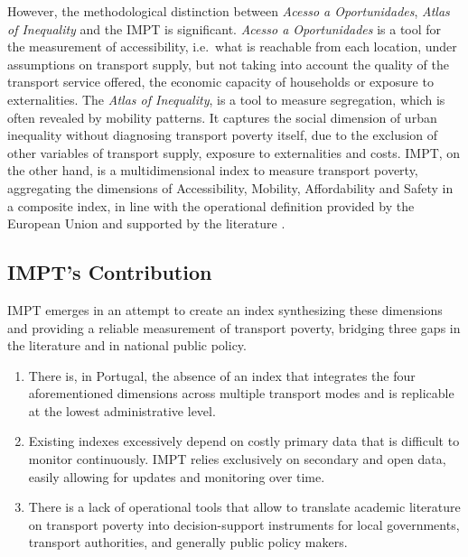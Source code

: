 \documentclass[
  authoryear,
  review,
  1p]{elsarticle}
\providecommand{\tightlist}{%
  \setlength{\itemsep}{0pt}\setlength{\parskip}{0pt}}
\begin{document}
However, the methodological distinction between \emph{Acesso a
Oportunidades}, \emph{Atlas of Inequality} and the IMPT is significant.
\emph{Acesso a Oportunidades} is a tool for the measurement of
accessibility, i.e.~what is reachable from each location, under
assumptions on transport supply, but not taking into account the quality
of the transport service offered, the economic capacity of households or
exposure to externalities. The \emph{Atlas of Inequality}, is a tool to
measure segregation, which is often revealed by mobility patterns. It
captures the social dimension of urban inequality without diagnosing
transport poverty itself, due to the exclusion of other variables of
transport supply, exposure to externalities and costs. IMPT, on the
other hand, is a multidimensional index to measure transport poverty,
aggregating the dimensions of Accessibility, Mobility, Affordability and
Safety in a composite index, in line with the operational definition
provided by the European Union \citep{EU_2023955}
\citep{EuropeanCommission_2024} and supported by the literature
\citep{Lucas_2016} \citep{MejiaDorantes_MurauskaiteBull_2022}.

\subsection{IMPT's Contribution}\label{sec-LR_contribution}

IMPT emerges in an attempt to create an index synthesizing these
dimensions and providing a reliable measurement of transport poverty,
bridging three gaps in the literature and in national public policy.

\begin{enumerate}
\def\labelenumi{\arabic{enumi}.}
\tightlist
\item
  There is, in Portugal, the absence of an index that integrates the
  four aforementioned dimensions across multiple transport modes and is
  replicable at the lowest administrative level.
\item
  Existing indexes excessively depend on costly primary data that is
  difficult to monitor continuously. IMPT relies exclusively on
  secondary and open data, easily allowing for updates and monitoring
  over time.
\item
  There is a lack of operational tools that allow to translate academic
  literature on transport poverty into decision-support instruments for
  local governments, transport authorities, and generally public policy
  makers.
\end{enumerate}
\end{document}
